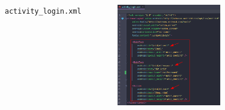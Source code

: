 \documentclass{beamer}
\begin{document}
\begin{frame}
\begin{columns}
\begin{figure}
        \end{figure}
        \indent \texttt{activity\_login.xml}
        \begin{figure}
            \centering
            \includegraphics[width=\textwidth]{images/28.png}
        \end{figure}
    \end{columns}
\end{frame}
\end{document}
